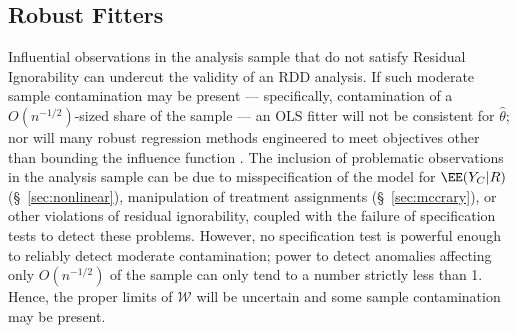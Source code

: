 


\subsection{Robust Fitters}\label{sec:robustFitters}
Influential observations in the analysis sample that do not satisfy Residual
Ignorability %
 can undercut the validity of an RDD analysis. 
If such moderate sample contamination may be present --- specifically, contamination of
a $O(n^{-1/2})$-sized
share of the sample --- an OLS fitter will not be consistent for $\hat{\theta}$;
nor will many robust regression methods engineered to meet
objectives other than bounding the influence function
\citep{stefanski1991note}.
The inclusion of problematic observations in the analysis sample can
be due to misspecification of the model for $\EE (Y_{C}|R)$
(\S~\ref{sec:nonlinear}), manipulation of treatment assignments
(\S~\ref{sec:mccrary}), or other violations of residual ignorability,
coupled with the failure of specification tests to detect these problems.
However, no specification test is powerful enough
to reliably detect moderate contamination; power to detect anomalies
affecting only $O(n^{-1/2})$ of the sample can only tend to a number
strictly less than 1.
Hence, the
proper limits of $\mathcal{W}$ will be uncertain
and some sample contamination may be present.

